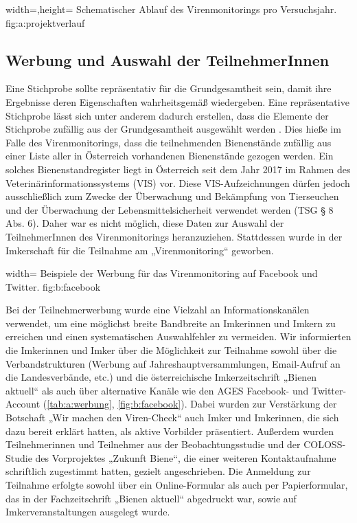 {width=\textwidth,height=\textheight}
{Schematischer Ablauf des Virenmonitorings pro Versuchsjahr.}%
{}%
{fig:a:projektverlauf}%


\subsection{Werbung und Auswahl der TeilnehmerInnen}\label{chap:werbung}

Eine Stichprobe sollte repräsentativ für die Grundgesamtheit sein, damit ihre Ergebnisse deren Eigenschaften wahrheitsgemäß wiedergeben. Eine repräsentative Stichprobe lässt sich unter anderem dadurch erstellen, dass die Elemente der Stichprobe zufällig aus der Grundgesamtheit ausgewählt werden \citep{vanderzee2013}. Dies hieße im Falle des Virenmonitorings, dass die teilnehmenden Bienenstände zufällig aus einer Liste aller in Österreich vorhandenen Bienenstände gezogen werden. Ein solches Bienenstandregister liegt in Österreich seit dem Jahr 2017 im Rahmen des Veterinärinformationssystems (VIS) vor. Diese VIS-Aufzeichnungen dürfen jedoch ausschließlich zum Zwecke der Überwachung und Bekämpfung von Tierseuchen und der Überwachung der Lebensmittelsicherheit verwendet werden (TSG § 8 Abs. 6). Daher war es nicht möglich, diese Daten zur Auswahl der TeilnehmerInnen des Virenmonitorings heranzuziehen. Stattdessen wurde in der Imkerschaft für die Teilnahme am „Virenmonitoring“ geworben. 

  {width=\textwidth} %
  {Beispiele der Werbung für das Virenmonitoring auf Facebook und Twitter.} %
  {} %
  {fig:b:facebook} %

Bei der Teilnehmerwerbung wurde eine Vielzahl an Informationskanälen verwendet, um eine möglichst breite Bandbreite an Imkerinnen und Imkern zu erreichen und einen systematischen Auswahlfehler zu vermeiden. Wir informierten die Imkerinnen und Imker über die Möglichkeit zur Teilnahme sowohl über die Verbandstrukturen (Werbung auf Jahreshauptversammlungen, Email-Aufruf an die Landesverbände, etc.) und die österreichische Imkerzeitschrift „Bienen aktuell“ als auch über alternative Kanäle wie den AGES Facebook- und Twitter-Account (\cref{tab:a:werbung}, \cref{fig:b:facebook}). Dabei wurden zur Verstärkung der Botschaft „Wir machen den Viren-Check“ auch Imker und Imkerinnen, die sich dazu bereit erklärt hatten, als aktive Vorbilder präsentiert.
Außerdem wurden Teilnehmerinnen und Teilnehmer aus der Beobachtungsstudie und der COLOSS-Studie des Vorprojektes „Zukunft Biene“, die einer weiteren Kontaktaufnahme schriftlich zugestimmt hatten, gezielt angeschrieben. Die Anmeldung zur Teilnahme erfolgte sowohl über ein Online-Formular als auch per Papierformular, das in der Fachzeitschrift „Bienen aktuell“ abgedruckt war, sowie auf Imkerveranstaltungen ausgelegt wurde.

